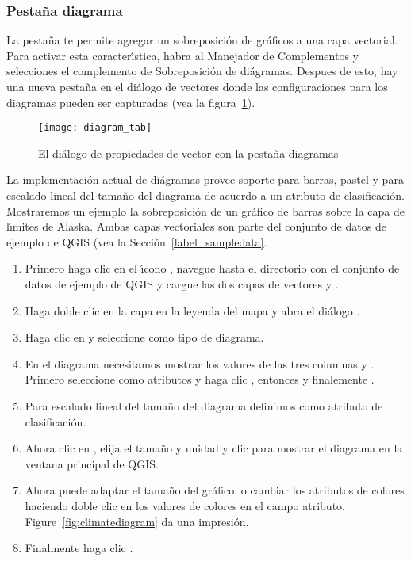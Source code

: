 \subsubsection{Pesta\~na diagrama}\label{sec:diagram}

La pesta\~na  te permite agregar un sobreposici\'on de gr\'aficos a una capa vectorial.
Para activar esta caracter\'{\i}stica, habra al Manejador de Complementos y selecciones el complemento  
de Sobreposici\'on de di\'agramas. Despues de esto, hay una nueva pesta\~na en el di\'alogo de vectores  donde las configuraciones para los diagramas pueden ser capturadas (vea 
la figura~\ref{fig:diagramtab}).

\begin{figure}[ht]
   \begin{center}
   \caption{El di\'alogo de propiedades de vector con la pesta\~na diagramas \nixcaption}\label{fig:diagramtab}\smallskip
   \texttt{[image: diagram\_tab]}
\end{center}
\end{figure}

La implementaci\'on actual de di\'agramas provee soporte para barras, pastel
y para escalado lineal del tama\~no del diagrama de acuerdo a un atributo de
clasificaci\'on. Mostraremos un ejemplo la sobreposici\'on de un gr\'afico de barras
sobre la capa de l\'{\i}mites de Alaska.
Ambas capas vectoriales son parte del conjunto de datos de ejemplo de QGIS (vea
la Secci\'on~\ref{label_sampledata}.

\begin{enumerate}
\item Primero haga clic en el \'{\i}cono ,
navegue hasta el directorio con el conjunto de datos de ejemplo de QGIS y cargue las dos capas de vectores
 y .
\item Haga doble clic en la capa  en la leyenda del mapa y abra el di\'alogo
.
\item Haga clic en  y seleccione  como
tipo de diagrama.
\item En el diagrama necesitamos mostrar los valores de las tres columnas
 y . Primero seleccione
 como atributos y haga clic , entonces
 y finalemente .  
\item Para escalado lineal del tama\~no del diagrama definimos 
como atributo de clasificaci\'on.
\item Ahora clic en , elija el tama\~no y unidad y clic
 para mostrar el diagrama en la ventana principal de QGIS.
\item Ahora puede adaptar el tama\~no del gr\'afico, o cambiar los atributos de colores haciendo
doble clic en los valores de colores en el campo atributo.
Figure~\ref{fig:climatediagram} da una impresi\'on.
\item Finalmente haga clic . 
\end{enumerate}

